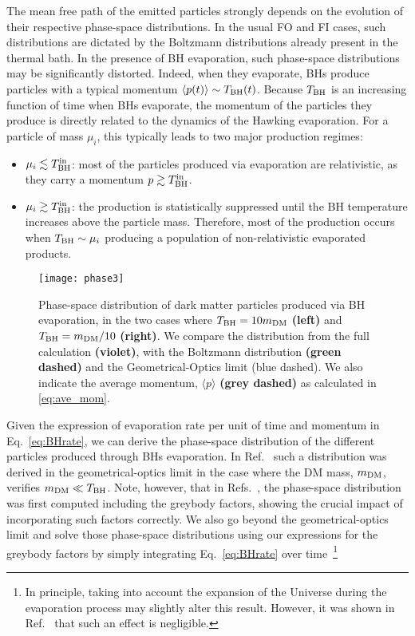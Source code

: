 \documentclass[aps,prd,reprint,twocolumn,preprintnumbers,floatfix,nofootinbib]{revtex4-1}
\newcommand{\mDM}{m_{\rm DM}}
\newcommand{\TBH}{T_{\rm BH}}
\begin{document}
The mean free path of the emitted particles strongly depends on the evolution of their respective phase-space distributions. In the usual FO and FI cases, such distributions are dictated by the Boltzmann distributions already present in the thermal bath. In the presence of BH evaporation, such phase-space distributions may be significantly distorted. Indeed, when they evaporate, BHs produce particles with a typical momentum $\langle p(t)\rangle\sim \TBH(t)$. Because $\TBH$ is an increasing function of time when BHs evaporate, the momentum of the particles they produce is directly related to the dynamics of the Hawking evaporation. For a particle of mass $\mu_i$, this typically leads to two major production regimes:
\begin{itemize}
  \item $\mu_i\lesssim \TBH^{\rm in}$:  most of the particles produced via evaporation are relativistic, as they carry a momentum $p\gtrsim \TBH^{\rm in}$.
  \item $\mu_i\gtrsim \TBH^{\rm in}$:  the production is statistically suppressed until the BH temperature increases above the particle mass. Therefore, most of the production occurs when $\TBH\sim \mu_i$ producing a population of non-relativistic evaporated products.
\end{itemize}
\begin{figure*}
 \centering
 \texttt{[image: phase3]}
 \caption{\footnotesize\label{fig:phasespace} Phase-space distribution of dark matter particles produced via BH evaporation, in the two cases where $\TBH=10 \mDM$ \textbf{(left)} and $\TBH=\mDM/10$ \textbf{(right)}. We compare the distribution from the full calculation \textbf{(violet)}, with the Boltzmann distribution \textbf{(green dashed)} and the Geometrical-Optics limit (blue dashed). We also indicate the average momentum, $\langle p\rangle$ \textbf{(grey dashed)} as calculated in \eqref{eq:ave_mom}.}
\end{figure*}
Given the expression of evaporation rate per unit of time and momentum in Eq.~\eqref{eq:BHrate}, we can derive the phase-space distribution of the different particles produced through BHs evaporation. 
In Ref.~\cite{Baldes:2020nuv} such a distribution was derived in the geometrical-optics limit in the case where the DM mass, $\mDM$, verifies $\mDM\ll \TBH$.
Note, however, that in Refs.~\cite{Auffinger:2020afu,Masina:2021zpu}, the phase-space distribution was first computed including the greybody factors, showing the crucial impact of incorporating such factors correctly.
We also go beyond the geometrical-optics limit and solve those phase-space distributions using our expressions for the greybody factors by simply integrating Eq.~\eqref{eq:BHrate} over time~\footnote{In principle, taking into account the expansion of the Universe during the evaporation process may slightly alter this result. However, it was shown in Ref.~\cite{Baldes:2020nuv} that such an effect is negligible.}
\end{document}
